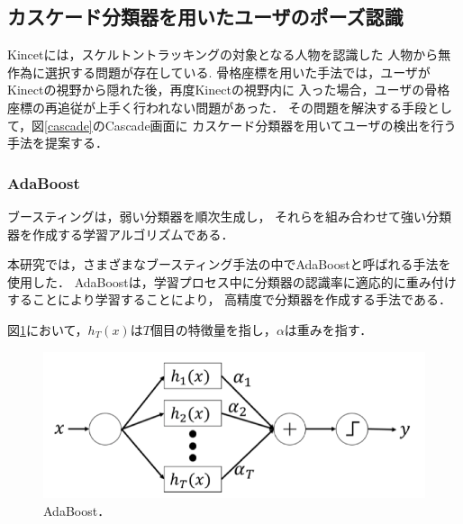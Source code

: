 \vspace{1.5cm}


\clearpage

\subsection{カスケード分類器を用いたユーザのポーズ認識}
Kincetには，スケルトントラッキングの対象となる人物を認識した
人物から無作為に選択する問題が存在している\cite{hitogomi}.
骨格座標を用いた手法では，ユーザがKinectの視野から隠れた後，再度Kinectの視野内に
入った場合，ユーザの骨格座標の再追従が上手く行われない問題があった\cite{beppu}．
その問題を解決する手段として，図\ref{cascade}のCascade画面に
カスケード分類器を用いてユーザの検出を行う手法を提案する．




\subsubsection{AdaBoost}
ブースティングは，弱い分類器を順次生成し，
それらを組み合わせて強い分類器を作成する学習アルゴリズムである\cite{boosting}．

本研究では，さまざまなブースティング手法の中でAdaBoostと呼ばれる手法を使用した．
AdaBoostは，学習プロセス中に分類器の認識率に適応的に重み付けすることにより学習することにより，
高精度で分類器を作成する手法である\cite{adaboost}．

図\ref{adaboost}において，$h_T(x)$は$T$個目の特徴量を指し，$\alpha$は重みを指す．

\vspace{1.2cm}


\begin{figure}[h]
    \centering
    \includegraphics[width=12cm]{image/adaboost.png}
    \caption[AdaBoost]{AdaBoost\cite{adafig}．}
  \label{adaboost}
\end{figure}

\vspace{1.2cm}

